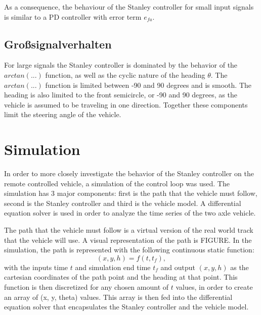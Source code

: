 \documentclass[arbeit=studie,oneside,BCOR=12mm]{ArbeitRST}
\begin{document}
As a consequence, the behaviour of the Stanley controller for small input
signals is similar to a PD controller with error term \(e_{fa}\). 

\subsection{Gro{\ss}signalverhalten}

For large signals the Stanley controller is dominated by the behavior of the
\(arctan(...)\) function, as well as the cyclic nature of the heading
\(\theta\). The \(arctan(...)\) function is limited between -90 and 90 degrees
and is smooth. The heading is also limited to the front semicircle, or -90 and
90 degrees, as the vehicle is assumed to be traveling in one direction.
Together these components limit the steering angle of the vehicle.

\iffalse

When dealing with large signals, the behavior of the Stanley controller is
mainly influenced by two factors: the cyclic nature of the heading \(\theta\)
and the \(arctan(...)\) function. The \(arctan(...)\) function is a smooth
function that is limited to a range between -90 and 90 degrees. On the other
hand, the heading is constrained to the front semicircle, which is between -90
and 90 degrees, as the vehicle is assumed to be traveling in one direction. As
a result, these two factors work in tandem to restrict the steering angle of
the vehicle, preventing it from becoming too large.

\fi

\section{Simulation}

\iffalse
In order to more closely investigate the behavior of the Stanley controller on
the remote controlled vehicle, a simulation of the control loop was used. The
simulation has 3 major components: first is the path that the vehicle must
follow, second is the Stanley controller and third is the vehicle model. A
differential equation solver is used in order to analyze the time series of the
two axle vehicle. 


The path that the vehicle must follow is a virtual version of the real world
track that the vehicle will use. A visual representation of the path is FIGURE.
In the simulation, the path is represented with the following continuous static
function: 
\begin{equation}
  (x, y, h) = f(t, t_f),
\end{equation}
with the inputs time $t$ and simulation end time $t_f$ and output $(x, y, h)$
as the cartesian coordinates of the path point and the heading at that point.
This function is then discretized for any chosen amount of $t$ values, in order
to create an array of (x, y, theta) values. This array is then fed into the
differential equation solver that encapsulates the Stanley controller and the
vehicle model. 
\end{document}
